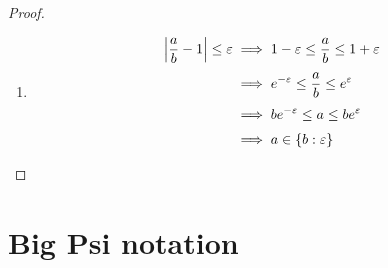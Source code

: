 \begin{proof}
\begin{enumerate}
    \item

      \begin{align}
        \abs{\frac ab - 1} \le \epsilon & \implies 1-\epsilon \le \frac ab \le 1+\epsilon \nl
        & \implies e^{-\epsilon} \le \frac ab \le e^{\epsilon} \nl
        & \implies be^{-\epsilon} \le a \le be^\epsilon \nl
        & \implies a \in \ean[\epsilon]{b}
      \end{align}
  \end{enumerate}

\end{proof}

\section{Big Psi notation}




